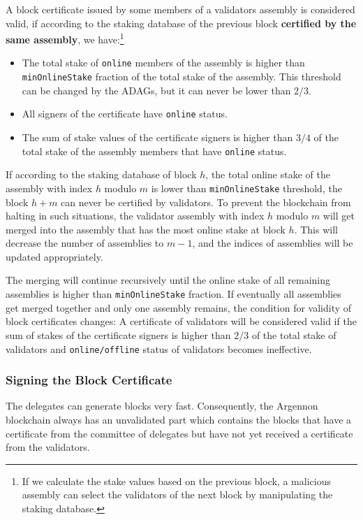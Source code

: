 A block certificate issued by some members of a validators assembly is considered valid, if according to
the staking database of the previous block \textbf{certified by the same assembly}, we have:\footnote{If we calculate
the stake values based on the previous block, a malicious assembly can select the validators of the next block by
manipulating the staking database.}
\begin{itemize}
    \item The total stake of \texttt{online} members of the assembly is higher than \texttt{minOnlineStake} fraction
    of the total stake of the assembly. This threshold can be changed by the ADAGs, but it can never be lower
    than $2/3$.
    \item All signers of the certificate have \texttt{online} status.
    \item The sum of stake values of the certificate signers is higher than $3/4$ of the total stake
    of the assembly members that have \texttt{online} status.
\end{itemize}

If according to the staking database of block $h$, the total online stake of the assembly with index $h$ modulo $m$ is
lower than \texttt{minOnlineStake} threshold, the block $h + m$ can never be certified by validators. To prevent the
blockchain from halting in such situations, the validator assembly with index $h$ modulo $m$ will get merged into the
assembly that has the most online stake at block $h$. This will decrease the number of assemblies to $m-1$, and the
indices of assemblies will be updated appropriately.

The merging will continue recursively until the online stake of all remaining assemblies is higher than
\texttt{minOnlineStake} fraction.
If eventually all assemblies get merged together and only one assembly remains, the condition
for validity of block certificates changes: A certificate of validators will be considered valid if the sum of stakes
of the certificate signers is higher than $2/3$ of the total stake of validators and \texttt{online/offline}
status of validators becomes ineffective.

\subsubsection{Signing the Block Certificate}

The delegates can generate blocks very fast. Consequently, the Argennon blockchain always has an
unvalidated part which contains the blocks that have a certificate from the committee of delegates but have not
yet received a certificate from the validators.


